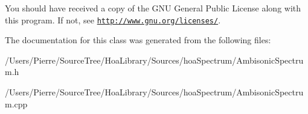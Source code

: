 You should have received a copy of the G\-N\-U General Public License along with this program. If not, see \href{http://www.gnu.org/licenses/}{\tt http\-://www.\-gnu.\-org/licenses/}. 

The documentation for this class was generated from the following files\-:\begin{DoxyCompactItemize}
\item 
/\-Users/\-Pierre/\-Source\-Tree/\-Hoa\-Library/\-Sources/hoa\-Spectrum/Ambisonic\-Spectrum.\-h\item 
/\-Users/\-Pierre/\-Source\-Tree/\-Hoa\-Library/\-Sources/hoa\-Spectrum/Ambisonic\-Spectrum.\-cpp\end{DoxyCompactItemize}
